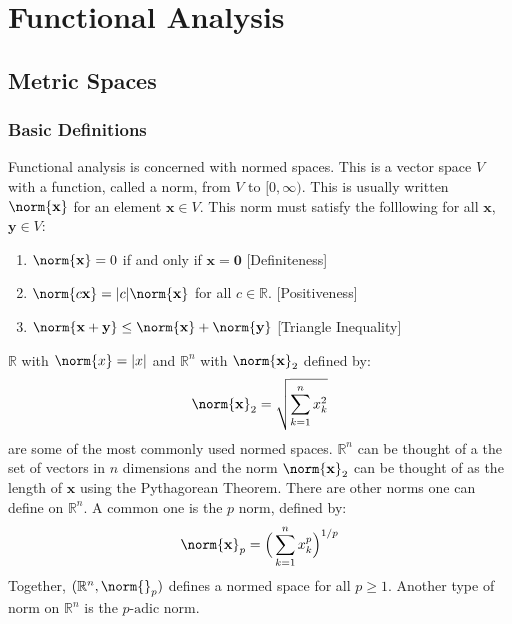 \chapter{Functional Analysis}
    \section{Metric Spaces}
        \subsection{Basic Definitions}
            Functional analysis is concerned with normed spaces.
            This is a vector space $V$ with a function, called
            a norm, from $V$ to $[0,\infty)$. This is usually
            written $\norm{\mathbf{x}}$ for an element
            $\mathbf{x}\in{V}$. This norm must satisfy the
            folllowing for all $\mathbf{x}$, $\mathbf{y}\in{V}$:
            \begin{enumerate}
                \item $\norm{\mathbf{x}}=0$ if and only
                      if $\mathbf{x}=\mathbf{0}$
                      \hfill[Definiteness]
                \item $\norm{c\mathbf{x}}=|c|\norm{\mathbf{x}}$
                      for all $c\in\mathbb{R}$.
                      \hfill[Positiveness]
                \item $\norm{\mathbf{x}+\mathbf{y}}%
                       \leq\norm{\mathbf{x}}+\norm{\mathbf{y}}$
                      \hfill[Triangle Inequality]
            \end{enumerate}
            \begin{example}
                $\mathbb{R}$ with $\norm{x}=|x|$ and
                $\mathbb{R}^{n}$ with $\norm{\mathbf{x}}_{2}$
                defined by:
                \begin{equation*}
                    \norm{\mathbf{x}}_{2}
                    =\sqrt{\sum_{k=1}^{n}x_{k}^{2}}
                \end{equation*}
                are some of the most commonly used normed spaces.
                $\mathbb{R}^{n}$ can be thought of a the set
                of vectors in $n$ dimensions and the norm
                $\norm{\mathbf{x}}_{2}$ can be thought of as
                the length of $\mathbf{x}$ using the
                Pythagorean Theorem. There are other norms one
                can define on $\mathbb{R}^{n}$. A common
                one is the $p$ norm, defined by:
                \begin{equation*}
                    \norm{\mathbf{x}}_{p}
                    =\Big(\sum_{k=1}^{n}x_{k}^{p}\Big)^{1/p}
                \end{equation*}
                Together, $(\mathbb{R}^{n},\norm{}_{p})$ defines
                a normed space for all $p\geq{1}$. Another type
                of norm on $\mathbb{R}^{n}$ is the
                $p\textrm{-adic}$ norm.
            \end{example}
